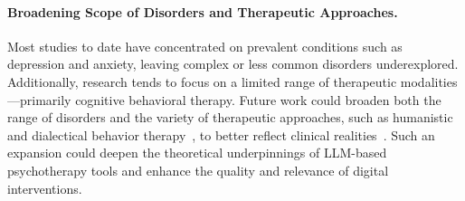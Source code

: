 \paragraph{Broadening Scope of Disorders and Therapeutic Approaches.} Most studies to date have concentrated on prevalent conditions such as depression and anxiety, leaving complex or less common disorders underexplored. Additionally, research tends to focus on a limited range of therapeutic modalities—primarily cognitive behavioral therapy. Future work could broaden both the range of disorders and the variety of therapeutic approaches, such as humanistic~\cite{schneider2010existential} and dialectical behavior therapy~\cite{lynch2006mechanisms}, to better reflect clinical realities~\cite{norcross2022predicted}. Such an expansion could deepen the theoretical underpinnings of LLM-based psychotherapy tools and enhance the quality and relevance of digital interventions.